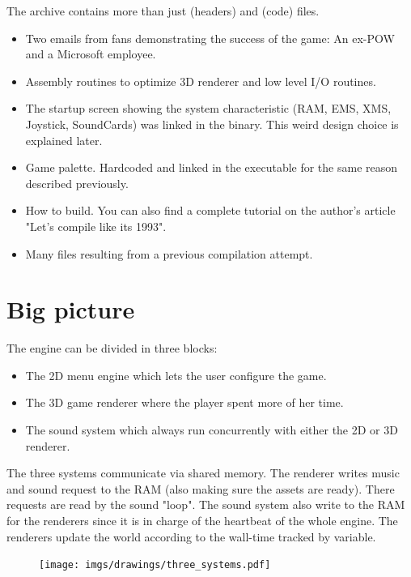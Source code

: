 \documentclass[book.tex]{subfiles}
\begin{document}
The archive contains more than just  (headers) and  (code) files.
\begin{itemize}
\item {} Two emails from fans demonstrating the success of the game: An ex-POW and a Microsoft employee.
\item {} Assembly routines to optimize 3D renderer and low level I/O routines.
\item {} The startup screen showing the system characteristic (RAM, EMS, XMS, Joystick, SoundCards) was linked in the binary. This weird design choice is explained later.
\item {} Game palette. Hardcoded and linked in the executable for the same reason described previously.
\item {} How to build. You can also find a complete tutorial on the author's article "Let's compile like its 1993".
\item Many files resulting from a previous compilation attempt.
\end{itemize}







\section{Big picture}
The engine can be divided in three blocks:
\begin{itemize}
\item The 2D menu engine which lets the user configure the game.
\item The 3D game renderer where the player spent more of her time.
\item The sound system which always run concurrently with either the 2D or 3D renderer. 
\end{itemize}
The three systems communicate via shared memory. The renderer writes music and sound request to the RAM (also making sure the assets are ready). There requests are read by the sound "loop". The sound system also write to the RAM for the renderers since it is in charge of the heartbeat of the whole engine. The renderers update the world according to the wall-time tracked by  variable.
\par
\begin{figure}[H]
\centering
 \texttt{[image: imgs/drawings/three\_systems.pdf]}
 \end{figure}
 \par
\end{document}
